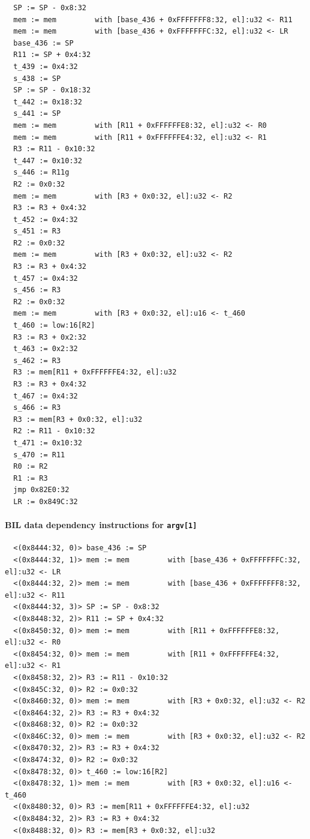 \documentclass[letterpaper,11pt]{article}
\begin{document}
\begin{verbatim}
  SP := SP - 0x8:32
  mem := mem         with [base_436 + 0xFFFFFFF8:32, el]:u32 <- R11
  mem := mem         with [base_436 + 0xFFFFFFFC:32, el]:u32 <- LR
  base_436 := SP
  R11 := SP + 0x4:32
  t_439 := 0x4:32
  s_438 := SP
  SP := SP - 0x18:32
  t_442 := 0x18:32
  s_441 := SP
  mem := mem         with [R11 + 0xFFFFFFE8:32, el]:u32 <- R0
  mem := mem         with [R11 + 0xFFFFFFE4:32, el]:u32 <- R1
  R3 := R11 - 0x10:32
  t_447 := 0x10:32
  s_446 := R11g
  R2 := 0x0:32
  mem := mem         with [R3 + 0x0:32, el]:u32 <- R2
  R3 := R3 + 0x4:32
  t_452 := 0x4:32
  s_451 := R3
  R2 := 0x0:32
  mem := mem         with [R3 + 0x0:32, el]:u32 <- R2
  R3 := R3 + 0x4:32
  t_457 := 0x4:32
  s_456 := R3
  R2 := 0x0:32
  mem := mem         with [R3 + 0x0:32, el]:u16 <- t_460
  t_460 := low:16[R2]
  R3 := R3 + 0x2:32
  t_463 := 0x2:32
  s_462 := R3
  R3 := mem[R11 + 0xFFFFFFE4:32, el]:u32
  R3 := R3 + 0x4:32
  t_467 := 0x4:32
  s_466 := R3
  R3 := mem[R3 + 0x0:32, el]:u32
  R2 := R11 - 0x10:32
  t_471 := 0x10:32
  s_470 := R11
  R0 := R2
  R1 := R3
  jmp 0x82E0:32
  LR := 0x849C:32
\end{verbatim}

\paragraph{BIL data dependency instructions for \texttt{argv[1]}}

\begin{verbatim}
  <(0x8444:32, 0)> base_436 := SP
  <(0x8444:32, 1)> mem := mem         with [base_436 + 0xFFFFFFFC:32, el]:u32 <- LR
  <(0x8444:32, 2)> mem := mem         with [base_436 + 0xFFFFFFF8:32, el]:u32 <- R11
  <(0x8444:32, 3)> SP := SP - 0x8:32
  <(0x8448:32, 2)> R11 := SP + 0x4:32
  <(0x8450:32, 0)> mem := mem         with [R11 + 0xFFFFFFE8:32, el]:u32 <- R0
  <(0x8454:32, 0)> mem := mem         with [R11 + 0xFFFFFFE4:32, el]:u32 <- R1
  <(0x8458:32, 2)> R3 := R11 - 0x10:32
  <(0x845C:32, 0)> R2 := 0x0:32
  <(0x8460:32, 0)> mem := mem         with [R3 + 0x0:32, el]:u32 <- R2
  <(0x8464:32, 2)> R3 := R3 + 0x4:32
  <(0x8468:32, 0)> R2 := 0x0:32
  <(0x846C:32, 0)> mem := mem         with [R3 + 0x0:32, el]:u32 <- R2
  <(0x8470:32, 2)> R3 := R3 + 0x4:32
  <(0x8474:32, 0)> R2 := 0x0:32
  <(0x8478:32, 0)> t_460 := low:16[R2]
  <(0x8478:32, 1)> mem := mem         with [R3 + 0x0:32, el]:u16 <- t_460
  <(0x8480:32, 0)> R3 := mem[R11 + 0xFFFFFFE4:32, el]:u32
  <(0x8484:32, 2)> R3 := R3 + 0x4:32
  <(0x8488:32, 0)> R3 := mem[R3 + 0x0:32, el]:u32
\end{verbatim}
\end{document}
